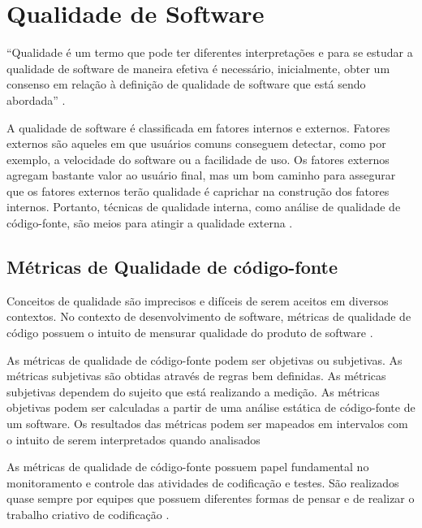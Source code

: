 \section{Qualidade de Software}

\begin{citacao}
“Qualidade é um termo que pode ter diferentes interpretações e para se estudar a qualidade de software de maneira efetiva é necessário, inicialmente, obter um consenso em relação à definição de qualidade de software que está sendo abordada” \cite[pág.~11]{braga2012}.
\end{citacao}

A qualidade de software é classificada em fatores internos e externos. Fatores externos são aqueles em que usuários comuns conseguem detectar, como por exemplo, a velocidade do software ou a facilidade de uso. Os fatores externos agregam bastante valor ao usuário final, mas um bom caminho para assegurar que os fatores externos terão qualidade é caprichar na construção dos fatores internos. Portanto, técnicas de qualidade interna, como análise de qualidade de código-fonte, são meios para atingir a qualidade externa \cite[pág.~4]{bueno2011}.

\subsection{Métricas de Qualidade de código-fonte}

Conceitos de qualidade são imprecisos e difíceis de serem aceitos em diversos contextos. No contexto de desenvolvimento de software, métricas de qualidade de código possuem o intuito de mensurar qualidade do produto de software \cite[pág.~1]{bueno2011}.

As métricas de qualidade de código-fonte podem ser objetivas ou subjetivas. As métricas subjetivas são obtidas através de regras bem definidas. As métricas subjetivas dependem do sujeito que está realizando a medição. As métricas objetivas podem ser calculadas a partir de uma análise estática de código-fonte de um software. Os resultados das métricas podem ser mapeados em intervalos com o intuito de serem interpretados quando analisados \cite[pág.~14]{meirelles2013}

As métricas de qualidade de código-fonte possuem papel fundamental no monitoramento e controle das atividades de codificação e testes. São realizados quase sempre por equipes que possuem diferentes formas de pensar e de realizar o trabalho criativo de codificação \cite[pág.~341]{sommerville}.

